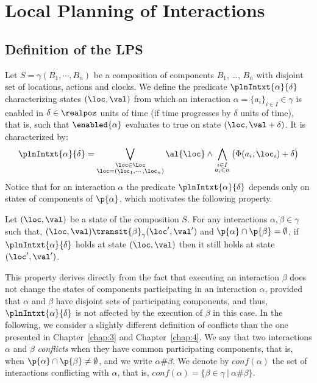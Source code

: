 \section{Local Planning of Interactions}
\subsection{Definition of the LPS}
\label{subsec:wp} 
Let $S=\gamma(B_1,\cdots,B_n)$ be a composition of components $B_1$, \ldots, $B_n$ with
disjoint set of locations, actions and clocks.
We define the predicate $\plnIntxt{\alpha}{\delta}$ characterizing states $(\loc, \val)$
from which an interaction $\alpha = \{ a_i \}_{i \in I} \in \gamma$ is enabled in 
$\delta \in \realpoz$ units of time (if time progresses by $\delta$ units of time),
that is, such that $\enabled{\alpha}$ evaluates to true on state $(\loc, \val + \delta)$.
It is characterized by:
\begin{equation}\label{eq:enf1}
\plnIntxt{\alpha}{\delta} = \bigvee_{\substack{\loc\in\Loc\\\loc=(\loc_1,\cdots,\loc_n)}}
  \al{\loc}\wedge\bigwedge_{\substack{i\in I\\a_i\in\alpha}}\big(\Phi(a_i,\loc_i) + \delta\big)
\end{equation}
Notice that for an interaction $\alpha$ the predicate $\plnIntxt{\alpha}{\delta}$ depends only 
on states of components of $\p{\alpha}$, which motivates the following property.

\begin{property}\label{pt:plnIn1}
Let $(\loc,\val)$ be a state of the composition $S$. For any interactions $\alpha,\beta\in\gamma$
such that, $(\loc,\val)\transit{\beta}_{\gamma}(\loc',\val')$ and $\p{\alpha}\cap\p{\beta}=
\emptyset$, if $\plnIntxt{\alpha}{\delta}$ holds at state $(\loc,\val)$ then it still 
holds at state $(\loc',\val')$.
\end{property}
This property derives directly from the fact that executing an interaction $\beta$ does 
not change the states of components participating in an interaction $\alpha$, 
provided that $\alpha$ and $\beta$ have disjoint sets of participating components, 
and thus, $\plnIntxt{\alpha}{\delta}$ is not affected by the execution of $\beta$ in this case.
In the following, we consider a slightly different definition of conflicts than the one
presented in Chapter~\ref{chap:3} and Chapter~\ref{chap:4}. 
We say that two interactions $\alpha$ and $\beta$ \emph{conflicts} when 
they have common participating components, that is, when $\p{\alpha}\cap\p{\beta}\neq\emptyset$, 
and we write $\alpha\#\beta$.
We denote by $conf(\alpha)$ the set of interactions conflicting with $\alpha$, that is, 
$conf(\alpha) = \{ \beta \in \gamma \ | \ \alpha\#\beta \}$.

